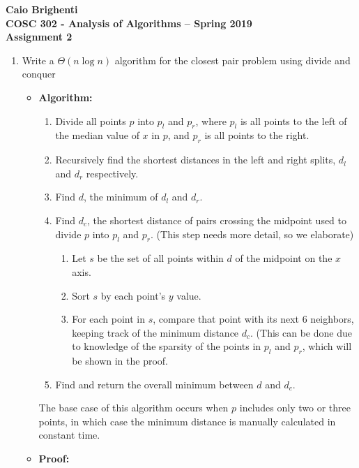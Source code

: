 \documentclass{article}
\begin{document}
\noindent \textbf{Caio Brighenti }\\
\noindent \textbf{COSC 302 - Analysis of Algorithms -- Spring 2019}\\%
\noindent \textbf{Assignment 2}\vspace{1em}\\
\begin{enumerate}
	\item Write a $\Theta (n\log n)$ algorithm for the closest pair problem using divide and conquer
	\begin{itemize}
	    \item \textbf{Algorithm:}
	        \begin{enumerate}
	            \item Divide all points $p$ into $p_l$ and $p_r$, where $p_l$ is all points to the left of the median value of $x$ in $p$, and $p_r$ is all points to the right.
	            \item Recursively find the shortest distances in the left and right splits, $d_l$ and $d_r$ respectively.
	            \item Find $d$, the minimum of $d_l$ and $d_r$.
	            \item Find $d_c$, the shortest distance of pairs crossing the midpoint used to divide $p$ into $p_l$ and $p_r$. (This step needs more detail, so we elaborate)
	                \begin{enumerate}
	                    \item Let $s$ be the set of all points within $d$ of the midpoint on the $x$ axis.
	                    \item Sort $s$ by each point's $y$ value.
	                    \item For each point in $s$, compare that point with its next 6 neighbors, keeping track of the minimum distance $d_c$. (This can be done due to knowledge of the sparsity of the points in $p_l$ and $p_r$, which will be shown in the proof.
	                \end{enumerate}
	           \item Find and return the overall minimum between $d$ and $d_c$.
	        \end{enumerate}
	        The base case of this algorithm occurs when $p$ includes only two or three points, in which case the minimum distance is manually calculated in constant time.
	   \item \textbf{Proof:}

\end{itemize}
\end{enumerate}
\end{document}
